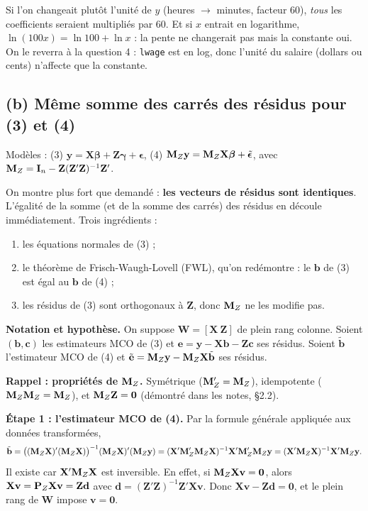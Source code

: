\documentclass[11pt,a4paper]{article}
\newcommand{\vy}{\mathbf{y}}\newcommand{\vX}{\mathbf{X}}\newcommand{\vZ}{\mathbf{Z}}
\newcommand{\ve}{\mathbf{e}}\newcommand{\vb}{\mathbf{b}}\newcommand{\vc}{\mathbf{c}}
\newcommand{\vbeta}{\bm{\beta}}\newcommand{\veps}{\bm{\epsilon}}\newcommand{\valpha}{\bm{\alpha}}
\begin{document}
\begin{attention}
Si l'on changeait plutôt l'unité de $y$ (heures $\to$ minutes, facteur 60), \emph{tous} les coefficients seraient multipliés par 60. Et si $x$ entrait en logarithme, $\ln(100x)=\ln 100+\ln x$ : la pente ne changerait pas mais la constante oui. On le reverra à la question 4 : \texttt{lwage} est en log, donc l'unité du salaire (dollars ou cents) n'affecte que la constante.
\end{attention}

\subsection{(b) Même somme des carrés des résidus pour (3) et (4)}

Modèles : \quad (3) $\vy=\vX\vbeta+\vZ\bm\gamma+\veps$, \qquad (4) $\Mz\vy=\Mz\vX\vbeta+\tilde{\veps}$, \quad avec $\Mz=\I_n-\vZ(\vZ'\vZ)^{-1}\vZ'$.

\begin{idee}
On montre plus fort que demandé : \textbf{les vecteurs de résidus sont identiques}. L'égalité de la somme (et de la somme des carrés) des résidus en découle immédiatement. Trois ingrédients :
\begin{enumerate}[nosep]
\item les équations normales de (3) ;
\item le théorème de Frisch-Waugh-Lovell (FWL), qu'on redémontre : le $\vb$ de (3) est égal au $\vb$ de (4) ;
\item les résidus de (3) sont orthogonaux à $\vZ$, donc $\mathbf{M}_Z$ ne les modifie pas.
\end{enumerate}
\end{idee}

\textbf{Notation et hypothèse.} On suppose $\mathbf W=[\vX\ \vZ]$ de plein rang colonne. Soient $(\vb,\vc)$ les estimateurs MCO de (3) et $\ve=\vy-\vX\vb-\vZ\vc$ ses résidus. Soient $\tilde{\vb}$ l'estimateur MCO de (4) et $\tilde{\ve}=\Mz\vy-\Mz\vX\tilde{\vb}$ ses résidus.

\textbf{Rappel : propriétés de $\mathbf{M}_Z$.} Symétrique ($\mathbf{M}_Z'=\mathbf{M}_Z$), idempotente ($\mathbf{M}_Z\mathbf{M}_Z=\mathbf{M}_Z$), et $\Mz\vZ=\mathbf 0$ (démontré dans les notes, §2.2).

\medskip
\textbf{Étape 1 : l'estimateur MCO de (4).} Par la formule générale appliquée aux données transformées,
\[
\tilde{\vb}=\big((\Mz\vX)'(\Mz\vX)\big)^{-1}(\Mz\vX)'(\Mz\vy)=(\vX'\Mz'\Mz\vX)^{-1}\vX'\Mz'\Mz\vy=(\vX'\Mz\vX)^{-1}\vX'\Mz\vy .
\]
Il existe car $\vX'\Mz\vX$ est inversible. En effet, si $\Mz\vX\mathbf v=\mathbf 0$, alors $\vX\mathbf v=\Pz\vX\mathbf v=\vZ\mathbf d$ avec $\mathbf d=(\vZ'\vZ)^{-1}\vZ'\vX\mathbf v$. Donc $\vX\mathbf v-\vZ\mathbf d=\mathbf 0$, et le plein rang de $\mathbf W$ impose $\mathbf v=\mathbf 0$.
\end{document}
